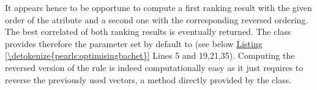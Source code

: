 \documentclass[a4paper,12pt,english]{sphinxhowto}
\begin{document}
\sphinxAtStartPar
It appears hence to be opportune to compute a first  ranking result with the given order of the  atribute and a second one with the corresponding reversed ordering. The best correlated of both ranking results is eventually returned. The  class provides therefore the  parameter set by default to  (see below \hyperref[\detokenize{pearls:optimisingbachet}]{Listing \ref{\detokenize{pearls:optimisingbachet}}} Lines 5 and 19,21,35). Computing the reversed version of the  rule is indeed computationally easy as it just requires to reverse the previously used  vectors, a method directly provided by the  class.
\def\sphinxLiteralBlockLabel{\label{\detokenize{pearls:optimisingbachet}}}
%
\end{document}

